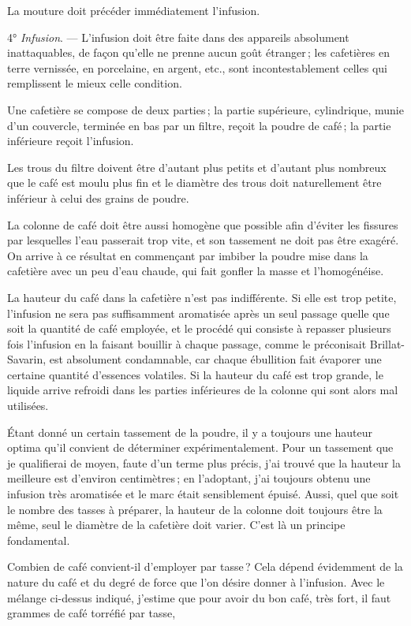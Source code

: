 La mouture doit précéder immédiatement l'infusion.

\medskip

4° \textit{Infusion}. — L'infusion doit être faite dans des appareils
absolument inattaquables, de façon qu'elle ne prenne aucun goût étranger ; les
cafetières en terre vernissée, en porcelaine, en argent, etc., sont
incontestablement celles qui remplissent le mieux celle condition.

Une cafetière se compose de deux parties ; la partie supérieure, cylindrique,
munie d'un couvercle, terminée en bas par un filtre, reçoit la poudre de café ;
la partie inférieure reçoit l'infusion.

Les trous du filtre doivent être d'autant plus petits et d'autant plus nombreux
que le café est moulu plus fin et le diamètre des trous doit naturellement être
inférieur à celui des grains de poudre.

La colonne de café doit être aussi homogène que possible afin d'éviter les fissures
par lesquelles l'eau passerait trop vite, et son tassement ne doit pas être exagéré.
On arrive à ce résultat en commençant par imbiber la poudre mise dans la cafetière
avec un peu d'eau chaude, qui fait gonfler la masse et l'homogénéise.

La hauteur du café dans la cafetière n'est pas indifférente. Si elle est trop
petite, l'infusion ne sera pas suffisamment aromatisée après un seul passage
quelle que soit la quantité de café employée, et le procédé qui consiste
à repasser plusieurs fois l'infusion en la faisant bouillir à chaque passage,
comme le préconisait Brillat-Savarin, est absolument condamnable, car chaque
ébullition fait évaporer une certaine quantité d'essences volatiles. Si la
hauteur du café est trop grande, le liquide arrive refroidi dans les parties
inférieures de la colonne qui sont alors mal utilisées.

Étant donné un certain tassement de la poudre, il y a toujours une hauteur
optima qu'il convient de déterminer expérimentalement. Pour un tassement que je
qualifierai de moyen, faute d'un terme plus précis, j'ai trouvé que la hauteur
la meilleure est d'environ {\mmm} centimètres ; en l'adoptant, j'ai
toujours obtenu une infusion très aromatisée et le marc était sensiblement
épuisé. Aussi, quel que soit le nombre des tasses à préparer, la hauteur de la
colonne doit toujours être la même, seul le diamètre de la cafetière doit
varier. C'est là un principe fondamental.

Combien de café convient-il d'employer par tasse ? Cela dépend évidemment de
la nature du café et du degré de force que l'on désire donner à l'infusion. Avec le
mélange ci-dessus indiqué, j'estime que pour avoir du bon café, très fort, il faut
{\mmm} grammes de café torréfié par tasse,

